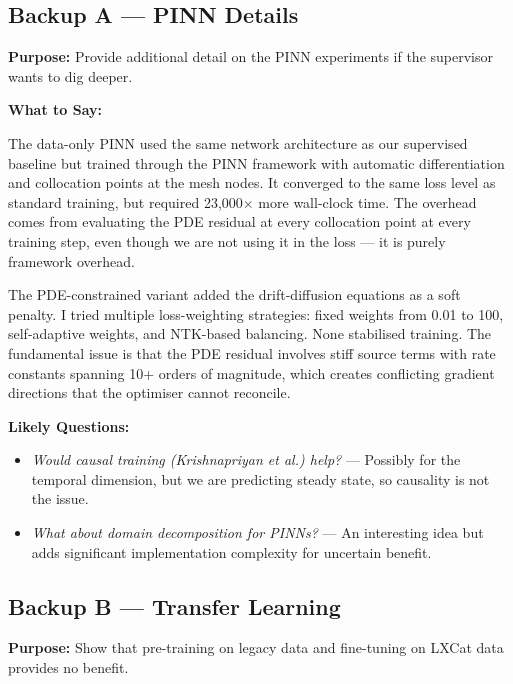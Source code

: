 \documentclass[12pt,a4paper]{article}
\begin{document}
\subsection*{Backup A --- PINN Details}

\textbf{Purpose:} Provide additional detail on the PINN experiments
if the supervisor wants to dig deeper.

\textbf{What to Say:}

The data-only PINN used the same network architecture as our
supervised baseline but trained through the PINN framework with
automatic differentiation and collocation points at the mesh nodes.
It converged to the same loss level as standard training, but
required 23,000$\times$ more wall-clock time. The overhead comes
from evaluating the PDE residual at every collocation point at every
training step, even though we are not using it in the loss --- it
is purely framework overhead.

The PDE-constrained variant added the drift-diffusion equations
as a soft penalty. I tried multiple loss-weighting strategies:
fixed weights from 0.01 to 100, self-adaptive weights, and
NTK-based balancing. None stabilised training. The fundamental
issue is that the PDE residual involves stiff source terms with
rate constants spanning 10+ orders of magnitude, which creates
conflicting gradient directions that the optimiser cannot reconcile.

\textbf{Likely Questions:}
\begin{itemize}
  \item \emph{Would causal training (Krishnapriyan et al.) help?}
    --- Possibly for the temporal dimension, but we are predicting
    steady state, so causality is not the issue.
  \item \emph{What about domain decomposition for PINNs?}
    --- An interesting idea but adds significant implementation
    complexity for uncertain benefit.
\end{itemize}

\bigskip

\subsection*{Backup B --- Transfer Learning}

\textbf{Purpose:} Show that pre-training on legacy data and
fine-tuning on LXCat data provides no benefit.
\end{document}
